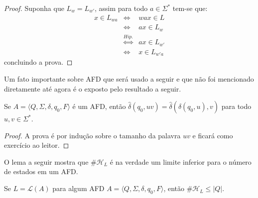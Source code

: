 \begin{proof}
	Suponha que $L_w = L_{w'}$, assim para todo $a \in \Sigma^*$ tem-se que:
	\begin{eqnarray*}
		x \in L_{wa} &\Longleftrightarrow & wax \in L\\
		& \Longleftrightarrow  & ax \in L_w\\
		& \stackrel{Hip.}{\Longleftrightarrow} & ax \in L_{w'}\\
		& \Longleftrightarrow  & x \in L_{w'a}
	\end{eqnarray*}
	concluindo a prova.
\end{proof}

Um fato importante sobre AFD que será usado a seguir e que não foi mencionado diretamente até agora é o exposto pelo resultado a seguir.

\begin{proposition}\label{prop:AssociatividadeDelta}
	Se $A = \langle Q, \Sigma, \delta, q_0, F\rangle$ é um AFD, então $\widehat{\delta}(q_0, uv) = \widehat{\delta}( \widehat{\delta}(q_0, u), v)$ para todo $u,v \in \Sigma^*$.
\end{proposition}

\begin{proof}
	A prova é por indução sobre o tamanho da palavra $uv$ e ficará como exercício ao leitor.
\end{proof}

O lema a seguir mostra que $\# \mathcal{H}_L$ é na verdade um limite inferior para o número de estados em um AFD. 

\begin{lemma}\label{lema:LimiteInferiorEstados}
	Se $L = \mathcal{L}(A)$ para algum AFD $A = \langle Q, \Sigma, \delta, q_0, F\rangle$, então $\# \mathcal{H}_L \leq |Q|$.
\end{lemma}

